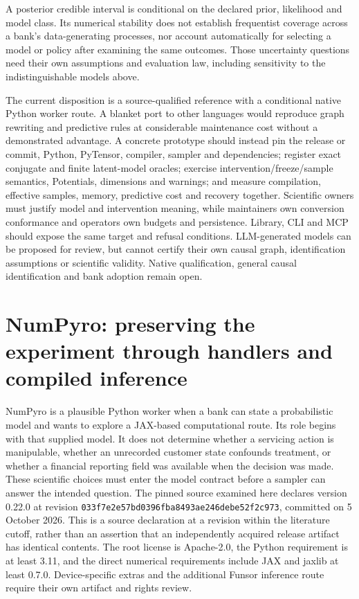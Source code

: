 A posterior credible interval is conditional on the declared prior,
likelihood and model class. Its numerical stability does not establish
frequentist coverage across a bank's data-generating processes, nor account
automatically for selecting a model or policy after examining the same
outcomes. Those uncertainty questions need their own assumptions and evaluation
law, including sensitivity to the indistinguishable models above.
\citep{exec23_pymc_reference}

The current disposition is a source-qualified reference with a conditional
native Python worker route. A blanket port to other languages would reproduce
graph rewriting and predictive rules at considerable maintenance cost without
a demonstrated advantage. A concrete prototype should instead pin the release
or commit, Python, PyTensor, compiler, sampler and dependencies; register exact
conjugate and finite latent-model oracles; exercise intervention/freeze/sample
semantics, Potentials, dimensions and warnings; and measure compilation,
effective samples, memory, predictive cost and recovery together. Scientific
owners must justify model and intervention meaning, while maintainers own
conversion conformance and operators own budgets and persistence. Library,
CLI and MCP should expose the same target and refusal conditions. LLM-generated
models can be proposed for review, but cannot certify their own causal graph,
identification assumptions or scientific validity. Native qualification,
general causal identification and bank adoption remain open.
\citep{exec23_pymc_sources,exec23_pymc_reference}


\section{NumPyro: preserving the experiment through handlers and compiled inference}
\label{sec:exec23-numpyro-worker}

NumPyro is a plausible Python worker when a bank can state a probabilistic model and wants to explore a JAX-based computational route. Its role begins with that supplied model. It does not determine whether a servicing action is manipulable, whether an unrecorded customer state confounds treatment, or whether a financial reporting field was available when the decision was made. These scientific choices must enter the model contract before a sampler can answer the intended question. The pinned source examined here declares version 0.22.0 at revision \texttt{033f7e2e57bd0396fba8493ae246debe52f2c973}, committed on 5 October 2026. This is a source declaration at a revision within the literature cutoff, rather than an assertion that an independently acquired release artifact has identical contents. The root license is Apache-2.0, the Python requirement is at least 3.11, and the direct numerical requirements include JAX and jaxlib at least 0.7.0. Device-specific extras and the additional Funsor inference route require their own artifact and rights review. \citep{exec23_numpyro_sources}

